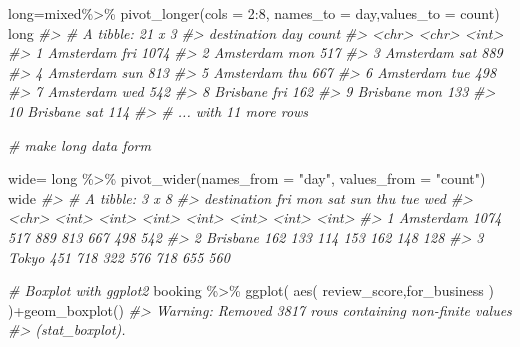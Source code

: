 \documentclass[
]{book}
\newenvironment{Shaded}{\begin{snugshade}}{\end{snugshade}}
\newcommand{\AttributeTok}[1]{\textcolor[rgb]{0.77,0.63,0.00}{#1}}
\newcommand{\CommentTok}[1]{\textcolor[rgb]{0.56,0.35,0.01}{\textit{#1}}}
\newcommand{\DecValTok}[1]{\textcolor[rgb]{0.00,0.00,0.81}{#1}}
\newcommand{\FunctionTok}[1]{\textcolor[rgb]{0.00,0.00,0.00}{#1}}
\newcommand{\NormalTok}[1]{#1}
\newcommand{\OtherTok}[1]{\textcolor[rgb]{0.56,0.35,0.01}{#1}}
\newcommand{\SpecialCharTok}[1]{\textcolor[rgb]{0.00,0.00,0.00}{#1}}
\newcommand{\StringTok}[1]{\textcolor[rgb]{0.31,0.60,0.02}{#1}}
\begin{document}
\begin{Shaded}
\begin{Highlighting}[]
\NormalTok{long}\OtherTok{=}\NormalTok{mixed}\SpecialCharTok{\%\textgreater{}\%}
  \FunctionTok{pivot\_longer}\NormalTok{(}\AttributeTok{cols =} \DecValTok{2}\SpecialCharTok{:}\DecValTok{8}\NormalTok{, }\AttributeTok{names\_to =} \StringTok{\textquotesingle{}day\textquotesingle{}}\NormalTok{,}\AttributeTok{values\_to =} \StringTok{\textquotesingle{}count\textquotesingle{}}\NormalTok{)}
\NormalTok{long}
\CommentTok{\#\textgreater{} \# A tibble: 21 x 3}
\CommentTok{\#\textgreater{}    destination day   count}
\CommentTok{\#\textgreater{}    \textless{}chr\textgreater{}       \textless{}chr\textgreater{} \textless{}int\textgreater{}}
\CommentTok{\#\textgreater{}  1 Amsterdam   fri    1074}
\CommentTok{\#\textgreater{}  2 Amsterdam   mon     517}
\CommentTok{\#\textgreater{}  3 Amsterdam   sat     889}
\CommentTok{\#\textgreater{}  4 Amsterdam   sun     813}
\CommentTok{\#\textgreater{}  5 Amsterdam   thu     667}
\CommentTok{\#\textgreater{}  6 Amsterdam   tue     498}
\CommentTok{\#\textgreater{}  7 Amsterdam   wed     542}
\CommentTok{\#\textgreater{}  8 Brisbane    fri     162}
\CommentTok{\#\textgreater{}  9 Brisbane    mon     133}
\CommentTok{\#\textgreater{} 10 Brisbane    sat     114}
\CommentTok{\#\textgreater{} \# ... with 11 more rows}

\CommentTok{\# make long data form}

\NormalTok{wide}\OtherTok{=}\NormalTok{ long }\SpecialCharTok{\%\textgreater{}\%} 
  \FunctionTok{pivot\_wider}\NormalTok{(}\AttributeTok{names\_from =} \StringTok{"day"}\NormalTok{, }\AttributeTok{values\_from =} \StringTok{"count"}\NormalTok{)}
\NormalTok{wide}
\CommentTok{\#\textgreater{} \# A tibble: 3 x 8}
\CommentTok{\#\textgreater{}   destination   fri   mon   sat   sun   thu   tue   wed}
\CommentTok{\#\textgreater{}   \textless{}chr\textgreater{}       \textless{}int\textgreater{} \textless{}int\textgreater{} \textless{}int\textgreater{} \textless{}int\textgreater{} \textless{}int\textgreater{} \textless{}int\textgreater{} \textless{}int\textgreater{}}
\CommentTok{\#\textgreater{} 1 Amsterdam    1074   517   889   813   667   498   542}
\CommentTok{\#\textgreater{} 2 Brisbane      162   133   114   153   162   148   128}
\CommentTok{\#\textgreater{} 3 Tokyo         451   718   322   576   718   655   560}


\CommentTok{\# Boxplot with ggplot2}
\NormalTok{booking }\SpecialCharTok{\%\textgreater{}\%} 
  \FunctionTok{ggplot}\NormalTok{(}
    \FunctionTok{aes}\NormalTok{(}
\NormalTok{      review\_score,for\_business}
\NormalTok{    )}
\NormalTok{  )}\SpecialCharTok{+}\FunctionTok{geom\_boxplot}\NormalTok{()}
\CommentTok{\#\textgreater{} Warning: Removed 3817 rows containing non{-}finite values}
\CommentTok{\#\textgreater{} (stat\_boxplot).}
\end{Highlighting}
\end{Shaded}
\end{document}
